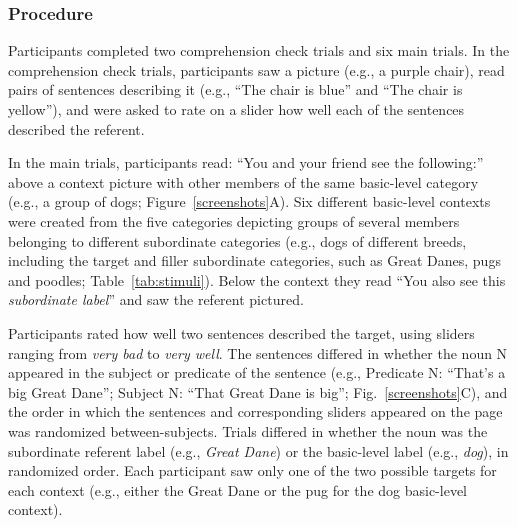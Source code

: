 \documentclass[10pt,letterpaper]{article}
\begin{document}
\subsubsection{Procedure}
Participants completed two comprehension check trials and six main trials. In the comprehension check trials, participants saw a picture (e.g., a purple chair), read pairs of sentences describing it (e.g., ``The chair is blue'' and ``The chair is yellow''), and were asked to rate on a slider how well each of the sentences described the referent.

In the main trials, participants read: ``You and your friend see the following:'' above a context picture with other members of the same basic-level category (e.g., a group of dogs; Figure~\ref{screenshots}A). 
Six different basic-level contexts were created from the five categories depicting groups of several members belonging to different subordinate categories (e.g., dogs of different breeds, including the target and filler subordinate categories, such as Great Danes, pugs and poodles; Table~\ref{tab:stimuli}).
Below the context they read ``You also see this \emph{subordinate label}'' and saw the referent pictured.

Participants rated how well two sentences described the target, using sliders ranging from \textit{very bad} to \textit{very well}. The sentences differed in whether the noun N appeared in the subject or predicate of the sentence (e.g., Predicate N: ``That's a big Great Dane''; Subject N: ``That Great Dane is big''; Fig.~\ref{screenshots}C), and the order in which the sentences and corresponding sliders appeared on the page was randomized between-subjects. 
Trials differed in whether the noun was the subordinate referent label (e.g., \emph{Great Dane}) or the basic-level label (e.g., \emph{dog}), in randomized order. 
Each participant saw only one of the two possible targets for each context (e.g., either the Great Dane or the pug for the dog basic-level context).
\end{document}
